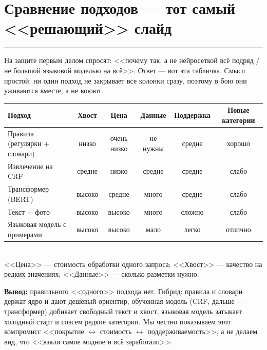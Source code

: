 \documentclass[11pt,a4paper]{article}
\newcommand{\secrule}{%
  \par\vspace{4pt}%
  {\color{mvred}\noindent\rule{\linewidth}{0.9pt}\par}%
  \vspace{8pt}%
}
\newcommand{\daysection}[1]{%
  \Needspace{22\baselineskip}%
  \section{#1}\secrule
}
\begin{document}
\daysection{Сравнение подходов --- тот самый <<решающий>> слайд}
На защите первым делом спросят: <<почему так, а не нейросеткой всё подряд / не большой языковой моделью на всё>>. Ответ --- вот эта табличка. Смысл простой: ни один подход не закрывает все колонки сразу, поэтому в бою они уживаются вместе, а не воюют.

\vspace{0.15cm}
\begin{center}
\small
\begin{tabular}{@{}p{3.4cm}ccccc@{}}
\toprule
\textbf{Подход} & \textbf{Хвост} & \textbf{Цена} & \textbf{Данные} & \textbf{Поддержка} & \textbf{Новые категории} \\
\midrule
Правила (регулярки + словари) & низко & очень низко & не нужны & средне & хорошо \\
Извлечение на CRF & средне & низко & средне & средне & слабо \\
Трансформер (BERT) & высоко & средне & много & средне & слабо \\
Текст + фото & высоко & высоко & много & сложно & слабо \\
Языковая модель с примерами & высоко & высоко & мало & легко & отлично \\
\bottomrule
\end{tabular}\\[3pt]
{\tiny\color{inksoft}<<Цена>> --- стоимость обработки одного запроса; <<Хвост>> --- качество на редких значениях; <<Данные>> --- сколько разметки нужно.}
\end{center}

\vspace{0.1cm}
{\color{mvred}\bfseries Вывод:} правильного <<одного>> подхода нет. Гибрид: правила и словари держат ядро и дают дешёвый ориентир, обученная модель (CRF, дальше --- трансформер) добивает свободный текст и хвост, языковая модель затыкает холодный старт и совсем редкие категории. Мы честно показываем этот компромисс <<покрытие $\leftrightarrow$ стоимость $\leftrightarrow$ поддерживаемость>>, а не делаем вид, что <<взяли самое модное и всё заработало>>.
\end{document}
